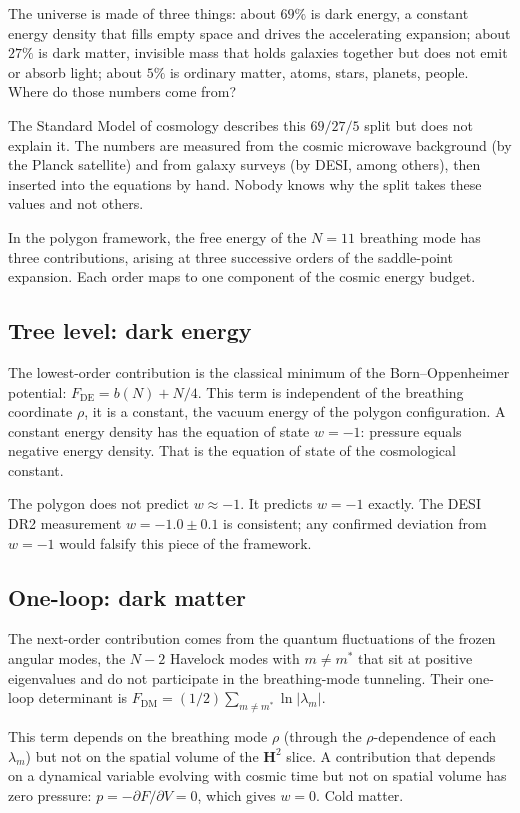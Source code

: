 The universe is made of three things: about $69\%$ is dark energy, a
constant energy density that fills empty space and drives the
accelerating expansion; about $27\%$ is dark matter, invisible mass
that holds galaxies together but does not emit or absorb light; about
$5\%$ is ordinary matter, atoms, stars, planets, people. Where do
those numbers come from?

The Standard Model of cosmology describes this $69/27/5$ split but
does not explain it. The numbers are measured from the cosmic
microwave background (by the Planck satellite) and from galaxy
surveys (by DESI, among others), then inserted into the equations by
hand. Nobody knows why the split takes these values and not others.

In the polygon framework, the free energy of the $N = 11$ breathing
mode has three contributions, arising at three successive orders of
the saddle-point expansion. Each order maps to one component of the
cosmic energy budget.

\subsection*{Tree level: dark energy}

The lowest-order contribution is the classical minimum of the
Born--Oppenheimer potential: $F_{\mathrm{DE}} = b(N) + N/4$. This
term is independent of the breathing coordinate $\rho$, it is a
constant, the vacuum energy of the polygon configuration. A constant
energy density has the equation of state $w = -1$: pressure equals
negative energy density. That is the equation of state of the
cosmological constant.

The polygon does not predict $w \approx -1$. It predicts $w = -1$
exactly. The DESI DR2 measurement $w = -1.0 \pm 0.1$ is consistent;
any confirmed deviation from $w = -1$ would falsify this piece of the
framework.

\subsection*{One-loop: dark matter}

The next-order contribution comes from the quantum fluctuations of the
frozen angular modes, the $N - 2$ Havelock modes with $m \ne m^*$
that sit at positive eigenvalues and do not participate in the
breathing-mode tunneling. Their one-loop determinant is
$F_{\mathrm{DM}} = (1/2)\sum_{m \ne m^*}\ln|\lambda_m|$.

This term depends on the breathing mode $\rho$ (through the
$\rho$-dependence of each $\lambda_m$) but not on the spatial volume
of the $\mathbf{H}^2$ slice. A contribution that depends on a
dynamical variable evolving with cosmic time but not on spatial
volume has zero pressure: $p = -\partial F/\partial V = 0$, which
gives $w = 0$. Cold matter.

